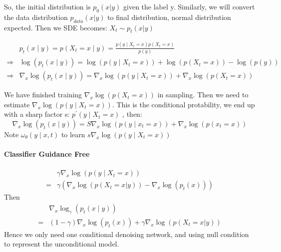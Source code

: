 So, the initial distribution is $p_0(x|y)$ given the label y. Similarly, we will convert the data distribution $p_{data}(x|y)$ to final distribution, normal distribution expected.
Then we SDE becomes: $X_t \sim p_t(x|y)$


\begin{equation}
    \begin{aligned}
    & p_{t}(x \mid y)=p\left(X_{t}=x \mid y\right)=\frac{p\left(y \mid X_{t}=x\right) p\left(X_{t}=x\right)}{p(y)} \\
    \Rightarrow & \log \left(p_{t}(x \mid y)\right)=\log \left(p\left(y \mid X_{t}=x\right)\right)+\log \left(p\left(X_{t}=x\right)\right)-\log (p(y)) \\
    \Rightarrow & \nabla_{x} \log \left(p_{t}(x \mid y)\right)=\nabla_{x} \log \left(p\left(y \mid X_{t}=x\right)\right)+\nabla_{x} \log \left(p\left(X_{t}=x\right)\right)
    \end{aligned}
\end{equation}
    
    
We have finished training  $\nabla_{x} \log \left(p\left(X_{t}=x\right)\right)$  in sampling. Then we need to estimate  $\nabla_{x} \log \left(p\left(y \mid X_{t}=x\right)\right)$. This is the conditional protability, we end up with a sharp factor s: $p^{\prime}\left(y \mid X_{t}=x\right)$ , then:
\begin{equation}
    \nabla_{x} \log \left(p_{t}(x \mid y)\right)=S \nabla_{x} \log \left(p\left(y \mid x_{t}=x\right)\right)+\nabla_{x} \log \left(p\left(x_{t}=x\right)\right)
\end{equation}
Note  $\omega_{\theta}(y \mid x, t)$  to learn  $s \nabla_{x} \log \left(p\left(y \mid X_{t}=x\right)\right)$ 

\paragraph{Classifier Guidance Free}
\begin{equation}
    \begin{aligned}
        &\gamma \nabla_{x} \log \left(p\left(y \mid X_{t}=x\right)\right)\\
         =& \gamma\left(\nabla_x \log \left(p(X_t=x|y)\right) - \nabla_x \log \left(p_t(x)\right)\right)
    \end{aligned}
\end{equation}
Then 
\begin{equation}
    \begin{aligned}
        &\nabla_{x} \log_\gamma \left(p_{t}(x \mid y)\right)\\
        =&(1-\gamma)\nabla_x \log \left(p_t(x)\right) + \gamma\nabla_x \log \left(p(X_t=x|y)\right)
    \end{aligned}
\end{equation}
Hence we only need one conditional denoising network, and using null condition to represent the unconditional model.


